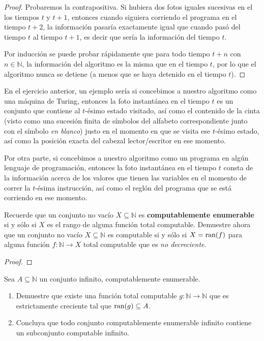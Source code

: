 \documentclass[12pt]{report}
\newcounter{it}
\theoremstyle{largebreak}
\newcommand\cf[3]{\ensuremath{#1:#2\rightarrow#3}}
\begin{document}
    \begin{proof}
        Probaremos la contrapositiva. Si hubiera dos fotos iguales sucesivas en el los tiempos $t$ y $t+1$, entonces cuando siguiera corriendo el programa en el tiempo $t+2$, la información pasaría exactamente igual que cuando pasó del tiempo $t$ al tiempo $t+1$, es decir que sería la información del tiempo $t$.
        
        Por inducción se puede probar rápidamente que para todo tiempo $t+n$ con $n\in\mathbb{N}$, la información del algoritmo es la misma que en el tiempo $t$, por lo que el algoritmo nunca se detiene (a menos que se haya detenido en el tiempo $t$).
    \end{proof}

    \begin{exa}
        En el ejercicio anterior, un ejemplo sería si concebimos a nuestro algoritmo como una máquina de Turing, entonces la foto instantánea en el tiempo $t$ es un conjunto que contiene al $t$-ésimo estado visitado, así como el contenido de la cinta (visto como una sucesión finita de símbolos del alfabeto correspondiente junto con el símbolo \textit{en blanco}) justo en el momento en que se visita ese $t$-ésimo estado, así como la posición exacta del cabezal lector/escritor en ese momento.

        Por otra parte, si concebimos a nuestro algoritmo como un programa en algún lenguaje de programación, entonces la foto instantánea en el tiempo $t$ consta de la información acerca de los valores que tienen las variables en el momento de correr la $t$-ésima instrucción, así como el reglón del programa que se está corriendo en ese momento.
    \end{exa}

    \begin{excer}
        Recuerde que un conjunto no vacío $X\subseteq\mathbb{N}$ es \textbf{computablemente enumerable} si y sólo si $X$ es el rango de alguna función total computable. Demuestre ahora que un conjunto no vacío $X\subseteq\mathbb{N}$ es computable si y sólo si $X=\textup{ran}(f)$ para alguna función $\cf{f}{\mathbb{N}}{X}$ total computable que es \textit{no decreciente}.
    \end{excer}

    \begin{proof}
        
    \end{proof}

    \begin{excer}
        Sea $A\subseteq\mathbb{N}$ un conjunto infinito, computablemente enumerable.
        \begin{enumerate}[label = \textit{(\alph*)}]
            \item Demuestre que existe una función total computable $\cf{g}{\mathbb{N}}{\mathbb{N}}$ que es estrictamente creciente tal que $\textup{ran}(g)\subseteq A$.
            \item Concluya que todo conjunto computablemente enumerable infinito contiene un subconjunto computable infinito.
        \end{enumerate}
    \end{excer}
\end{document}
